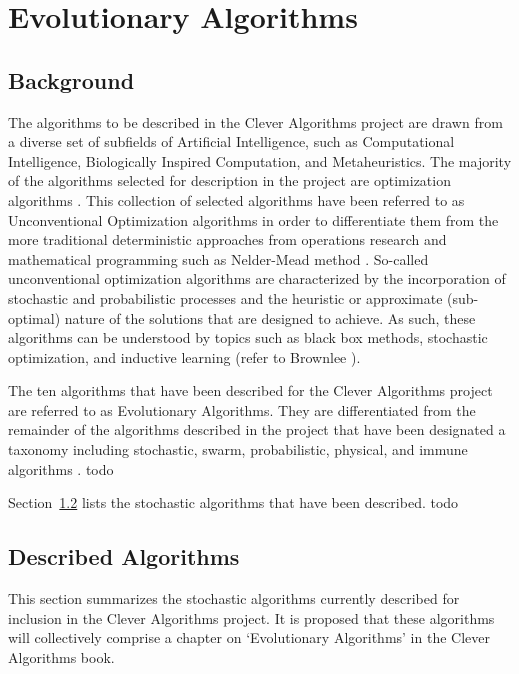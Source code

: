 \documentclass[a4paper, 11pt]{article}
\begin{document}
% 
% 
\section{Evolutionary Algorithms}
\label{sec:algorithms}

% 
% 
\subsection{Background}
The algorithms to be described in the Clever Algorithms project are drawn from a diverse set of subfields of Artificial Intelligence, such as Computational Intelligence, Biologically Inspired Computation, and Metaheuristics. The majority of the algorithms selected for description in the project are optimization algorithms \cite{Brownlee2010b}. 
This collection of selected algorithms have been referred to as Unconventional Optimization algorithms in order to differentiate them from the more traditional deterministic approaches from operations research and mathematical programming such as Nelder-Mead method \cite{Brownlee2010n}. So-called unconventional optimization algorithms are characterized by the incorporation of stochastic and probabilistic processes and the heuristic or approximate (sub-optimal) nature of the solutions that are designed to achieve. As such, these algorithms can be understood by topics such as black box methods, stochastic optimization, and inductive learning (refer to Brownlee \cite{Brownlee2010n}). 

The ten algorithms that have been described for the Clever Algorithms project are referred to as Evolutionary Algorithms. They are differentiated from the remainder of the algorithms described in the project that have been designated a taxonomy including stochastic, swarm, probabilistic, physical, and immune algorithms \cite{Brownlee2010b}. 
todo

Section~\ref{subsec:algorithms} lists the stochastic algorithms that have been described. todo

% 
% 
\subsection{Described Algorithms}
\label{subsec:algorithms}
This section summarizes the stochastic algorithms currently described for inclusion in the Clever Algorithms project. It is proposed that these algorithms will collectively comprise a chapter on `Evolutionary Algorithms' in the Clever Algorithms book. 
\end{document}
